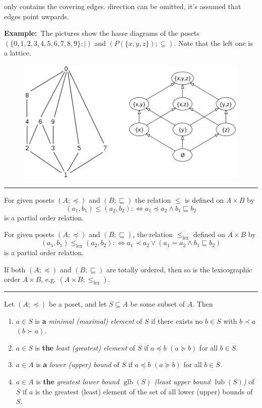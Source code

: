 \documentclass[a4paper]{extarticle}
\newcommand{\Ex}{\textbf{Example:}\ }
\DeclareMathOperator{\glb}{glb}
\DeclareMathOperator{\lub}{lub}
\newcommand{\sep}{\vspace{5pt}\noindent\hrule\vspace{5pt}}
\begin{document}
\begin{multicols*}{2}
 only contains the covering edges. direction can be omitted,
it's assumed that edges point uwpards.

\Ex The pictures show the hasse diagrams of the posets
$(\{0,1,2,3,4,5,6,7,8,9\};|)$ and $(P(\{x,y,z\});\subseteq)$. Note that the left
one is a lattice.

\begin{figure}[H]
 	\centering
  	\includegraphics[width=0.7\linewidth]{img/hasse-diagrams.png}
\end{figure}

\sep

 For given posets $(A;\preceq)$ and
$(B;\sqsubseteq)$ the relation $\leq$ is defined on $A\times B$ by
\[
(a_1,b_1) \leq (a_2,b_2) :\Longleftrightarrow a_1 \preceq a_2 \land b_1
\sqsubseteq b_2 \]
is a partial order relation. 

 For given posets $(A;\preceq)$ and $(B;\sqsubseteq)$,
the relation $\leq_{\text{lex}}$ defined on $A\times B$ by
\[
(a_1,b_1) \leq_{\text{lex}}(a_2,b_2) :\Longleftrightarrow a_1 \prec a_2 \lor
(a_1=a_2 \land b_1 \sqsubseteq b_2) \]
is a partial order relation. 

\Lem If both $(A;\preceq)$ and $(B;\sqsubseteq)$ are totally ordered, then so is
the lexicographic order $A\times B$, e.g. $(A\times B;\leq_\text{lex})$.

\sep

 Let $(A;\preceq)$ be a poset, and let $S\subseteq A$ be
some subset of $A$. Then
\begin{enumerate}
  \item $a\in S$ is \textbf{a} \emph{minimal (maximal) element} of $S$ if there
  exists no $b\in S$ with $b\prec a$ $(b\succ a)$.
  \item $a \in S$ is \textbf{the} \emph{least (greatest) element} of $S$ if $a
  \preceq b$ $(a\succeq b)$ for all $b\in S$.
  \item $a\in A$ is \textbf{a} \emph{lower (upper) bound} of $S$ if $a\preceq
  b$ $(a\succeq b)$ for all $b\in S$.
  \item $a \in A$ is \textbf{the} \emph{greatest lower bound $\glb (S)$ (least
  upper bound $\lub (S)$)} of $S$ if $a$ is the greatest (least) element of the
  set of all lower (upper) bounds of $S$.
\end{enumerate}


\end{multicols*}
\end{document}
